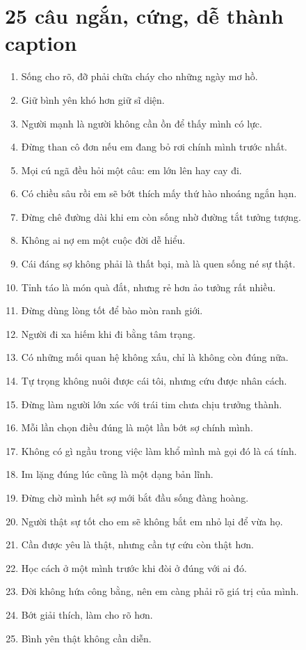 \section{25 câu ngắn, cứng, dễ thành caption}
\begin{enumerate}[leftmargin=*,resume]
\item Sống cho rõ, đỡ phải chữa cháy cho những ngày mơ hồ.
\item Giữ bình yên khó hơn giữ sĩ diện.
\item Người mạnh là người không cần ồn để thấy mình có lực.
\item Đừng than cô đơn nếu em đang bỏ rơi chính mình trước nhất.
\item Mọi cú ngã đều hỏi một câu: em lớn lên hay cay đi.
\item Có chiều sâu rồi em sẽ bớt thích mấy thứ hào nhoáng ngắn hạn.
\item Đừng chê đường dài khi em còn sống nhờ đường tắt tưởng tượng.
\item Không ai nợ em một cuộc đời dễ hiểu.
\item Cái đáng sợ không phải là thất bại, mà là quen sống né sự thật.
\item Tỉnh táo là món quà đắt, nhưng rẻ hơn ảo tưởng rất nhiều.
\item Đừng dùng lòng tốt để bào mòn ranh giới.
\item Người đi xa hiếm khi đi bằng tâm trạng.
\item Có những mối quan hệ không xấu, chỉ là không còn đúng nữa.
\item Tự trọng không nuôi được cái tôi, nhưng cứu được nhân cách.
\item Đừng làm người lớn xác với trái tim chưa chịu trưởng thành.
\item Mỗi lần chọn điều đúng là một lần bớt sợ chính mình.
\item Không có gì ngầu trong việc làm khổ mình mà gọi đó là cá tính.
\item Im lặng đúng lúc cũng là một dạng bản lĩnh.
\item Đừng chờ mình hết sợ mới bắt đầu sống đàng hoàng.
\item Người thật sự tốt cho em sẽ không bắt em nhỏ lại để vừa họ.
\item Cần được yêu là thật, nhưng cần tự cứu còn thật hơn.
\item Học cách ở một mình trước khi đòi ở đúng với ai đó.
\item Đời không hứa công bằng, nên em càng phải rõ giá trị của mình.
\item Bớt giải thích, làm cho rõ hơn.
\item Bình yên thật không cần diễn.
\end{enumerate}

